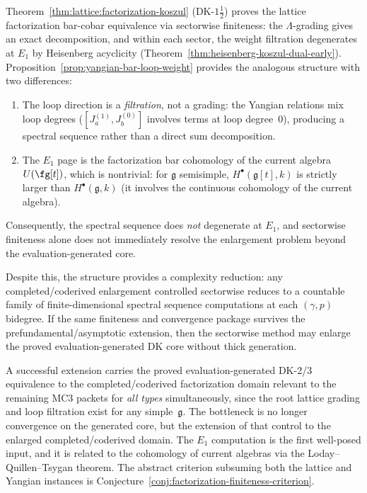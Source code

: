 \begin{remark}
\label{rem:sectorwise-vs-lattice}
Theorem~\ref{thm:lattice:factorization-koszul}
(DK-$1\frac{1}{2}$) proves the lattice factorization bar-cobar
equivalence via sectorwise finiteness: the $\Lambda$-grading gives
an exact decomposition, and within each sector, the weight
filtration degenerates at $E_1$ by Heisenberg acyclicity
(Theorem~\ref{thm:heisenberg-koszul-dual-early}).
Proposition~\ref{prop:yangian-bar-loop-weight} provides the
analogous structure with two differences:
\begin{enumerate}[label=\textup{(\alph*)}]
\item The loop direction is a \emph{filtration}, not a grading:
 the Yangian relations mix loop degrees
 ($[J^{(1)}_a, J^{(0)}_b]$ involves terms at loop degree~$0$),
 producing a spectral sequence rather than a direct sum
 decomposition.
\item The $E_1$ page is the factorization bar cohomology of the
 current algebra $U(\fg[t])$, which is nontrivial:
 for $\mathfrak{g}$ semisimple,
 $H^\bullet(\mathfrak{g}[t], k)$ is strictly larger than
 $H^\bullet(\mathfrak{g}, k)$
 (it involves the continuous cohomology of the current algebra).
\end{enumerate}
Consequently, the spectral sequence does \emph{not} degenerate at
$E_1$, and sectorwise finiteness alone does not immediately resolve
the enlargement problem beyond the evaluation-generated core.

Despite this, the structure provides a complexity reduction: any
completed/coderived enlargement controlled sectorwise reduces to a
countable family of finite-dimensional spectral sequence
computations at each $(\gamma, p)$ bidegree. If the same finiteness
and convergence package survives the prefundamental/asymptotic
extension, then the sectorwise method may enlarge the proved
evaluation-generated DK core without thick generation.

A successful extension carries the proved evaluation-generated
DK-2/3 equivalence to the
completed/coderived factorization domain relevant to the remaining
MC3 packets for \emph{all types} simultaneously, since the root
lattice grading and loop filtration exist for any
simple~$\mathfrak{g}$. The bottleneck is no longer convergence on
the generated core, but the extension of that control to the enlarged
completed/coderived domain. The $E_1$ computation is the first
well-posed input, and it is related to the cohomology of current
algebras via the Loday--Quillen--Tsygan theorem.
The abstract criterion subsuming both the lattice and Yangian
instances is
Conjecture~\ref{conj:factorization-finiteness-criterion}.
\end{remark}

